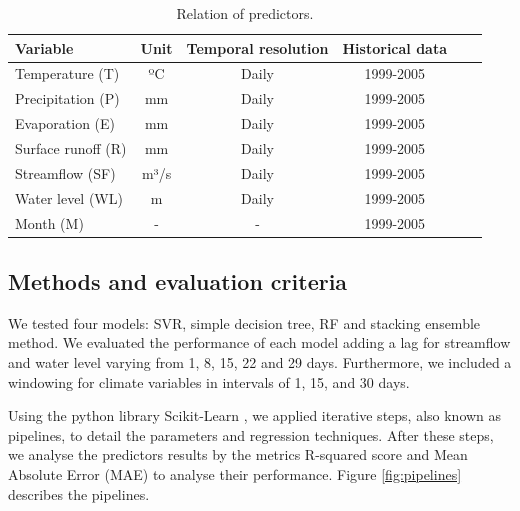 \documentclass[12pt]{article}
\begin{document}
\begin{table}[htbp]
    \centering
    \caption{Relation of predictors.}
    \label{tab:predictors}
    \renewcommand{\arraystretch}{.8}
    \small\begin{tabulary}{\textwidth}{lcCcCr}
        \toprule
        \normalsize\bfseries{Variable} &
        \normalsize\bfseries{Unit} &
        \normalsize\bfseries{Temporal resolution} &
        \normalsize\bfseries{Historical data}  \\
        \midrule
        Temperature (T)    & ºC   & Daily   & 1999-2005 \\
        Precipitation (P)  & mm   & Daily   & 1999-2005 \\
        Evaporation (E)    & mm   & Daily   & 1999-2005 \\
        Surface runoff (R) & mm   & Daily   & 1999-2005 \\
        Streamflow (SF)    & m³/s & Daily   & 1999-2005 \\
        Water level (WL)   & m    & Daily   & 1999-2005 \\
        Month (M)          & -   & -        & 1999-2005 \\
        \bottomrule
    \end{tabulary}
\end{table}


\subsection{Methods and evaluation criteria}

We tested four models: SVR, simple decision tree, RF and stacking ensemble method. We evaluated the performance of each model adding a lag for streamflow and water level varying from 1, 8, 15, 22 and 29 days. Furthermore, we included a windowing for climate variables in intervals of 1, 15, and 30 days.

Using the python library Scikit-Learn \cite{scikit-learn}, we applied iterative steps, also known as pipelines, to detail the parameters and regression techniques. After these steps, we analyse the predictors results by the metrics R-squared score and Mean Absolute Error (MAE) to analyse their performance. Figure \ref{fig:pipelines} describes the pipelines.
\end{document}
